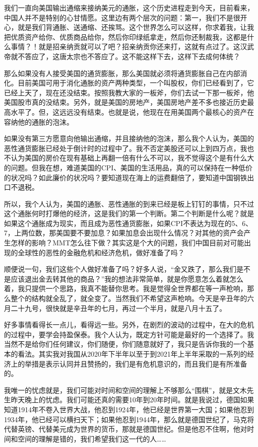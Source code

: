 \documentclass[UTF8, 12pt, a4paper]{ctexrep}
\begin{document}
我们一直向美国输出通缩来接纳美元的通胀，这个历史进程走到今天，目前看来，中国人并不是特别的心甘情愿。这里边有两个层次的问题：第一，我们不是很开心，就是我们背通胀、送通缩、还挨骂。这个世界怎么可以这样，你求着我，让我把优质资产给你、优质商品给你，然后你印绿纸拿走，然后你还制裁我，这都是什么事情？！就是招亲纳贡就可以了吧？招亲纳贡你还来打，这就有点过了。这汉武帝就不答应了，这唐太宗也不答应了。这不能这样下去，这样下去成何体统？

那么如果没有人接受美国的通货膨胀，那么美国就必须将通货膨胀自己在内部消化。目前美国可用于消化通胀的资产两种类型，一个叫股权，你们已经看到了，它已经上天了，现在还没结束。按照我教大家的一板斧，你们去试一下那一板斧，他美国股市真的没结束。另外，就是美国的房地产，美国房地产差不多也接近历史最高水平了。但，这远远没有结束。也就是说，他现在在用美国两个最核心的资产在容纳他的通胀的泡沫。

如果没有第三方愿意向他输出通缩，并且接纳他的泡沫，那么我个人认为，美国的恶性通货膨胀已经处于倒计时的过程中了。我不否定美股还可以上到四万点，我也不认为美国的房价在现有基础上再翻一倍有什么不可以，我不觉得这个是有什么大的问题。但我在想，难道美国的CPI、美国的生活用品，真的可以保持在一种低价的状况吗？如此廉价的状况吗？要知道现在海上的运费翻倍了，要知道中国钢铁出口不退税。

所以，我个人认为，美国的通胀、恶性通胀的到来已经是板上钉钉的事情，只不过这个通胀何时打爆他的经济，这是我们的第一个判断。第二个判断是什么呢？就是如果这个通胀成为现实，而且成为恶性通货膨胀，如果CPI不表达为现在的5、6、7，上两位数，那美国要不要加息？如果加息会出现什么情况？对其他的资产会产生怎样的影响？MMT怎么往下做？其实这是个大的问题，我们中国目前对可能出现的全球性的恶性的金融危机和经济危机，做好准备了吗？

顺便说一句，我们这些个人做好准备了吗？好多人说，“金又跌了，那么我们是不是应该退出金去转其他的商品？”我的想法非常简单，就是你愿意怎么着就怎么着，我只提供一个思路，我真不能替你思考。我是觉得全世界都在等一声枪响，那么整个的结构就全乱了，就全变了。当然我们不希望这声枪响。今天是辛丑年的六月二十九号，很快就是辛丑年的七月，再过一个半月，就是八月十五了。

好多事情看得长一点儿，看得远一些。另外，在剧烈的波动的过程中，在大的危机的过程中，要学会持盈保泰。我个人认为，既定方针可能是最好的一个选择了。我当然不是给你们任何建议，你们随便，你们随意就好了，我只是告诉你我的一个基本的看法。其实我对我国从2020年下半年以至于到2021年上半年采取的一系列的经济上的举措是表示认同并且赞扬的，我们是有危机意识的，而且我们是有所准备的。

我唯一的忧虑就是，我们可能对时间和空间的理解上不够那么“围棋”，就是文木先生昨天晚上的忧虑。我们可能还真的需要10年到20年时间。就是我说过，德国如果知道1914年不卷入世界大战，他忍到1924年，他已经是世界第一大国；如果他忍到1934年，他已经可以横扫天下；如果他忍到1944年，那么就是德国世纪了，马克将代替英镑、代替美元成为世界的货币，那就是德国世纪。但是他忍不住啊，他对时间和空间的理解是错的，我们希望我们这一代的人……
\end{document}
